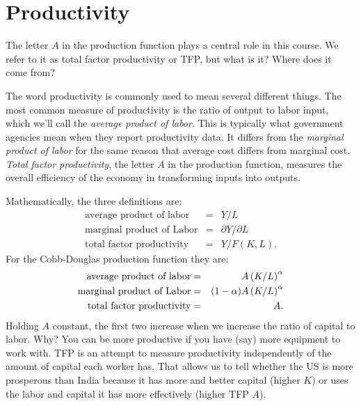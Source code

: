 \section{Productivity}

The letter $A$ in the production function plays a central role
in this course. We refer to it as total factor productivity 
 or TFP,
but what is it?  Where does it come from?


The word productivity is commonly used to mean several different
things. The most common measure of productivity is the ratio of
output to labor input, which we'll call the {\it average product
of labor\/}.  This is typically what government agencies mean when
they report productivity data.  It differs from the {\it marginal
product of labor\/} for the same reason that average cost differs
from marginal cost. {\it Total factor productivity\/},
the letter $A$ in the production function, measures the overall
efficiency of the economy in transforming inputs into outputs.

Mathematically, the three definitions are:
\begin{eqnarray*}
    \mbox{average product of labor} &=& {Y}/{ L} \\
    \mbox{marginal product of Labor} &=& {\partial Y}/{\partial L}\\
    \mbox{total factor productivity} &=& {Y}/{ F(K,L)} .
\end{eqnarray*}
For the Cobb-Douglas   production function they are:
\begin{eqnarray*}
    \mbox{average product of labor} &=& A \left({K}/{L}\right)^\alpha  \\
    \mbox{marginal product \index{capital!marginal product of|(textbf} of Labor} &=& (1-\alpha) A \left({K}/{L}\right)^\alpha \\
    \mbox{total factor productivity} &=& A  .
\end{eqnarray*}
Holding $A$ constant,
the first two increase when we increase the ratio of capital to labor.
Why?
You can be more productive if you have
(say) more equipment to work with.
TFP is an attempt to measure productivity independently
of the amount of capital each worker has.
That allows us to tell whether the US is more prosperous
than India because it has more and better capital (higher $K$)
or uses the labor and capital it has more effectively (higher TFP $A$).



